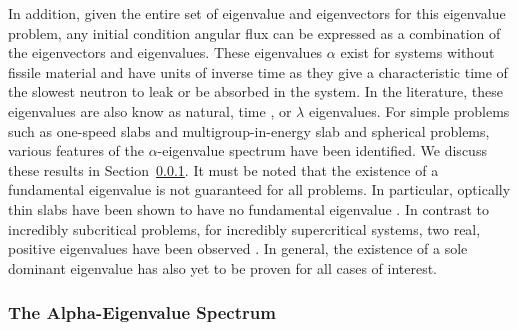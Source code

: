 In addition, given the entire set of eigenvalue and eigenvectors for this eigenvalue problem, any initial condition angular flux can be expressed as a combination of the eigenvectors and eigenvalues. These eigenvalues $\alpha$ exist for systems without fissile material and have units of inverse time as they give a characteristic time of the slowest neutron to leak or be absorbed in the system. In the literature, these eigenvalues are also know as natural, time \cite{hill_efficient_1983}, or $\lambda$ \cite{duderstadt_nuclear_1976} eigenvalues. For simple problems such as one-speed slabs and multigroup-in-energy slab and spherical problems, various features of the $\alpha$-eigenvalue spectrum have been identified. We discuss these results in Section~\ref{sec:AlphaSpec}. It must be noted that the existence of a fundamental eigenvalue is not guaranteed for all problems. In particular, optically thin slabs have been shown to have no fundamental eigenvalue \cite{kornreich_timeeigenvalue_2005}. In contrast to incredibly subcritical problems, for incredibly supercritical systems, two real, positive eigenvalues have been observed \cite{kornreich_timeeigenvalue_2005}. In general, the existence of a sole dominant eigenvalue has also yet to be proven for all cases of interest.

\subsubsection{The Alpha-Eigenvalue Spectrum}
\label{sec:AlphaSpec}

